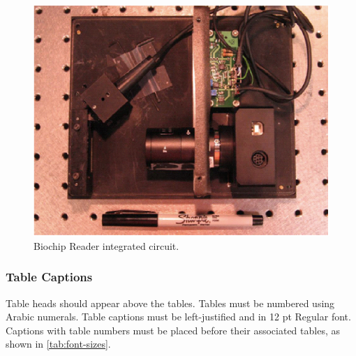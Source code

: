 \documentclass{siintec}
\begin{document}
\begin{figure}[ht]
    \centering
    \caption{Biochip Reader integrated circuit.}
    \label{fig:biochip}
        \vspace{0.5em}
    \includegraphics[width=0.7\linewidth]{biochip.png}
\end{figure}

\begin{graphic}[ht]
    \centering
    \caption{Diagram example created with TikZ.}
    \label{grph:tikz}
\end{graphic}

\subsubsection{Table Captions}
Table heads should appear above the tables. Tables must be numbered using Arabic numerals. Table captions must be left-justified and in 12 pt Regular font. Captions with table numbers must be placed before their associated tables, as shown in \autoref{tab:font-sizes}.

\end{document}
